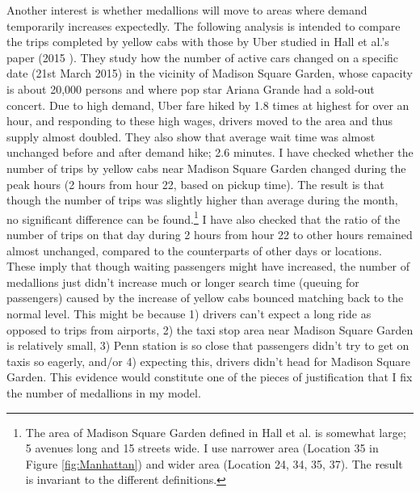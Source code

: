 Another interest is whether medallions will move to areas where demand temporarily increases expectedly. The following analysis is intended to compare the trips completed by yellow cabs with those by Uber studied in Hall et al.'s paper (2015 \cite{hall2015effects}). They study how the number of active cars changed on a specific date (21st March 2015) in the vicinity of Madison Square Garden, whose capacity is about 20,000 persons and where pop star Ariana Grande had a sold-out concert. Due to high demand, Uber fare hiked by 1.8 times at highest for over an hour, and responding to these high wages, drivers moved to the area and thus supply almost doubled. They also show that average wait time was almost unchanged before and after demand hike; 2.6 minutes. I have checked whether the number of trips by yellow cabs near Madison Square Garden changed during the peak hours (2 hours from hour 22, based on pickup time). The result is that though the number of trips was slightly higher than average during the month, no significant difference can be found.\footnote{The area of Madison Square Garden defined in Hall et al. is somewhat large; 5 avenues long and 15 streets wide. I use narrower area (Location 35 in Figure \ref{fig:Manhattan}) and wider area (Location 24, 34, 35, 37). The result is invariant to the different definitions.} I have also checked that the ratio of the number of trips on that day during 2 hours from hour 22 to other hours remained almost unchanged, compared to the counterparts of other days or locations. These imply that though waiting passengers might have increased, the number of medallions just didn't increase much or longer search time (queuing for passengers) caused by the increase of yellow cabs bounced matching back to the normal level. This might be because 1) drivers can’t expect a long ride as opposed to trips from airports, 2) the taxi stop area near Madison Square Garden is relatively small, 3) Penn station is so close that passengers didn’t try to get on taxis so eagerly, and/or 4) expecting this, drivers didn’t head for Madison Square Garden. This evidence would constitute one of the pieces of justification that I fix the number of medallions in my model.